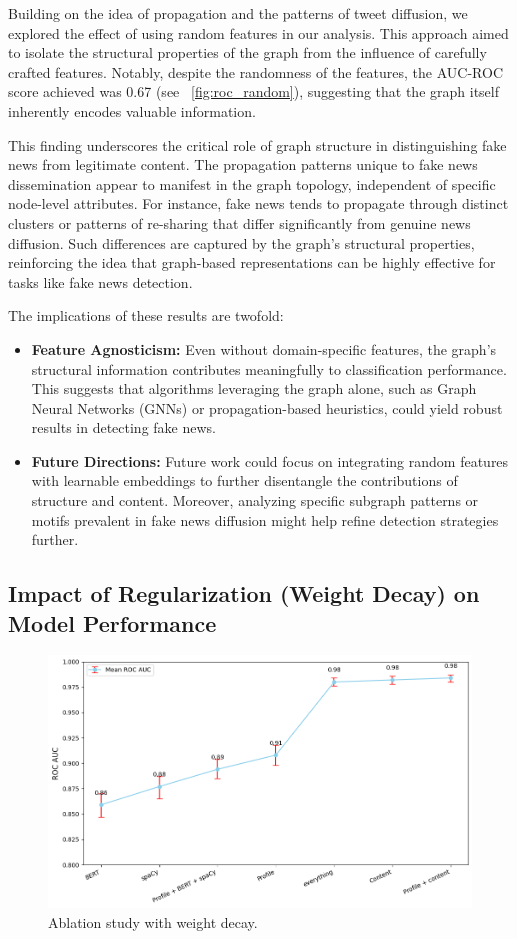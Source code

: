 \documentclass[sigconf,nonacm]{acmart}
\begin{document}
Building on the idea of propagation and the patterns of tweet diffusion, we explored the effect of using random features in our analysis. This approach aimed to isolate the structural properties of the graph from the influence of carefully crafted features. Notably, despite the randomness of the features, the AUC-ROC score achieved was 0.67 (see ~\ref{fig:roc_random}), suggesting that the graph itself inherently encodes valuable information.

This finding underscores the critical role of graph structure in distinguishing fake news from legitimate content. The propagation patterns unique to fake news dissemination appear to manifest in the graph topology, independent of specific node-level attributes. For instance, fake news tends to propagate through distinct clusters or patterns of re-sharing that differ significantly from genuine news diffusion. Such differences are captured by the graph's structural properties, reinforcing the idea that graph-based representations can be highly effective for tasks like fake news detection.

The implications of these results are twofold:
\begin{itemize}
    \item \textbf{Feature Agnosticism:} Even without domain-specific features, the graph's structural information contributes meaningfully to classification performance. This suggests that algorithms leveraging the graph alone, such as Graph Neural Networks (GNNs) or propagation-based heuristics, could yield robust results in detecting fake news.
    \item \textbf{Future Directions:} Future work could focus on integrating random features with learnable embeddings to further disentangle the contributions of structure and content. Moreover, analyzing specific subgraph patterns or motifs prevalent in fake news diffusion might help refine detection strategies further.
\end{itemize}

\subsection{Impact of Regularization (Weight Decay) on Model Performance}

\begin{figure}
    \centering
    \includegraphics[scale=0.35]{roc_weight_decay.png}
    \caption{Ablation study with weight decay.}
    \label{fig:roc_decay}
\end{figure}
\end{document}

